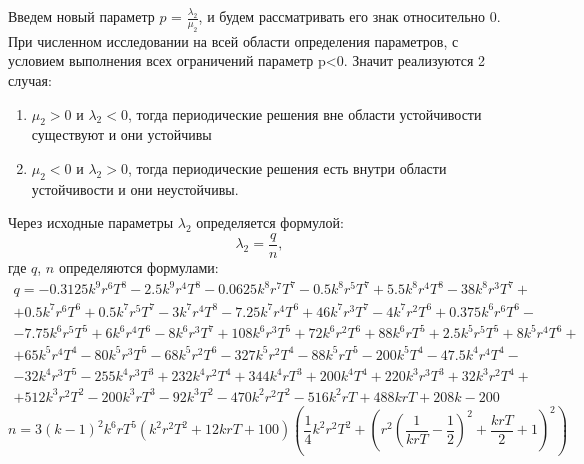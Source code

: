 \documentclass[12pt]{article}
\begin{document}
Введем новый параметр $p$ = $\frac{\lambda_2}{\mu_2}$, и будем рассматривать его знак относительно 0.
При численном исследовании на всей области определения параметров, с условием выполнения всех ограничений параметр p<0. Значит реализуются 2 случая:
\begin{enumerate}
 \item $ \mu_2 >0 $ и $\lambda_2 <0$, тогда периодические решения вне области устойчивости существуют и они устойчивы\\
 \item $ \mu_2 < 0 $ и $\lambda_2 >0$, тогда периодические решения есть внутри области устойчивости и они неустойчивы.\\
 \end{enumerate}
Через исходные параметры $\lambda_2$ определяется формулой:
\begin{equation*}
    \lambda_2 = \frac{q}{n} ,
\end{equation*}
где $q$, $n$ определяются формулами:
\begin{multline*}
   q = -0.3125 k^9 r^6 T^8-2.5 k^9 r^4 T^8-0.0625 k^8 r^7 T^7-0.5 k^8 r^5 T^7+5.5 k^8 r^4 T^8-38 k^8 r^3 T^7+\\+0.5 k^7 r^6 T^6+0.5 k^7 r^5 T^7-3 k^7 r^4 T^8-7.25 k^7 r^4 T^6+46 k^7 r^3 T^7-4 k^7 r^2 T^6+0.375 k^6 r^6 T^6-\\-7.75 k^6 r^5 T^5+6 k^6 r^4 T^6-8 k^6 r^3 T^7+108 k^6 r^3 T^5+72 k^6 r^2 T^6+88 k^6 r T^5+2.5 k^5 r^5 T^5+8 k^5 r^4 T^6+\\+65 k^5 r^4 T^4-80 k^5 r^3 T^5-68 k^5 r^2 T^6-327 k^5 r^2 T^4-88 k^5 r T^5-200 k^5 T^4-47.5 k^4 r^4 T^4-\\-32 k^4 r^3 T^5-255 k^4 r^3 T^3+232 k^4 r^2 T^4+344 k^4 r T^3+200 k^4 T^4+220 k^3 r^3 T^3+32 k^3 r^2 T^4+\\+512 k^3 r^2 T^2-200 k^3 r T^3-92 k^3 T^2-470 k^2 r^2 T^2-516 k^2 r T+488 k r T+208 k-200
\end{multline*}
\begin{equation*}
   n= 3(k-1)^2 k^6 r T^5 \left(k^2 r^2 T^2+12 k r T+100\right)\left(\frac{1}{4} k^2 r^2 T^2+\left(r^2 \left(\frac{1}{k r T}-\frac{1}{2}\right)^2+\frac{k r T}{2}+1\right)^2\right)
\end{equation*}

\newpage
\end{document}
